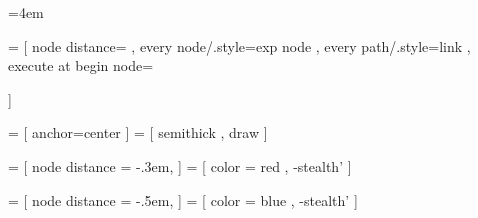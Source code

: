 
\newdimen\nodedistance
\nodedistance=4em

  = [ node distance=\nodedistance
    , every node/.style={exp node}
    , every path/.style={link}
    , execute at begin node={\strut}
    ]

  = [ anchor=center
    ]
  = [ semithick
    , draw
    ]

  = [ node distance = -.3em,
    ]
  = [ color = red
    , -stealth'
    ]

  = [ node distance = -.5em,
    ]
  = [ color = blue
    , -stealth'
    ]

%



\newcommand{\coord}[1]{\tikz[remember picture] \coordinate (#1);}

\newcommand{\distanceTop}{7.15pt}

\newcommand{\distanceBottom}{-2.55pt}

\newcommand{\distanceLeft}{-0.5pt}

\newcommand{\distanceRight}{0.5pt}


%
\newcommand{\drawrect}[4][]{\begin{tikzpicture}[remember picture, overlay]
\draw[layout box, #1]
  ($(#2) +(\distanceLeft, \distanceTop) + (-#4, #4)$) rectangle
  ($(#3) + (\distanceRight, \distanceBottom) + (#4, -#4)$);
\end{tikzpicture}}

%
\newcommand{\drawbox}[5][]{\begin{tikzpicture}[remember picture, overlay]
\draw[layout box, #1]
  ($(#2) + (\distanceLeft, \distanceTop) + (-#5, #5)$) --
  ($(#4 |- #2) + (\distanceRight, \distanceTop) + (#5, #5)$) --
  ($(#4) + (\distanceRight, \distanceBottom) + (#5, -#5)$) --
  ($(#3 |- #4) + (\distanceLeft, \distanceBottom) + (-#5, -#5)$) --
  ($(#3 |- #2) + (\distanceLeft, \distanceBottom) + (-#5, -#5)$) --
  ($(#2) + (\distanceLeft, \distanceBottom) + (-#5, -#5)$) --
  cycle;
\end{tikzpicture}}

